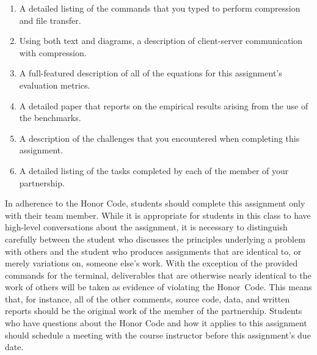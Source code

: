 \begin{enumerate}

    \item A detailed listing of the commands that you typed to perform compression and file transfer.

    \item Using both text and diagrams, a description of client-server communication with compression.

    \item A full-featured description of all of the equations for this assignment's evaluation metrics.

    \item A detailed paper that reports on the empirical results arising from the use of the benchmarks.

    \item A description of the challenges that you encountered when completing this assignment.

    \item A detailed listing of the tasks completed by each of the member of your partnership.

\end{enumerate}

In adherence to the Honor Code, students should complete this assignment only with their team member. While it is
appropriate for students in this class to have high-level conversations about the assignment, it is necessary to
distinguish carefully between the student who discusses the principles underlying a problem with others and the student
who produces assignments that are identical to, or merely variations on, someone else's work.  With the exception of the
provided commands for the terminal, deliverables that are otherwise nearly identical to the work of others will be taken
as evidence of violating the \mbox{Honor Code}. This means that, for instance, all of the other comments, source code,
data, and written reports should be the original work of the member of the partnership. Students who have questions
about the Honor Code and how it applies to this assignment should schedule a meeting with the course instructor before
this assignment's due date.


